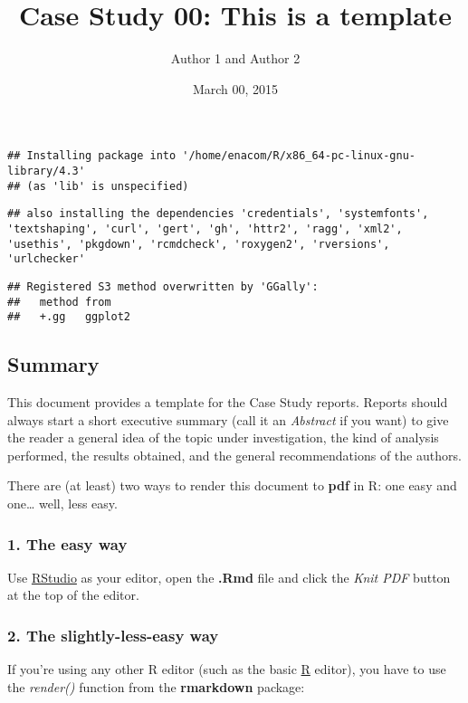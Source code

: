 \documentclass[
]{article}
\title{Case Study 00: This is a template}
\author{Author 1 and Author 2}
\date{March 00, 2015}
\begin{document}
\maketitle

\begin{verbatim}
## Installing package into '/home/enacom/R/x86_64-pc-linux-gnu-library/4.3'
## (as 'lib' is unspecified)
\end{verbatim}

\begin{verbatim}
## also installing the dependencies 'credentials', 'systemfonts', 'textshaping', 'curl', 'gert', 'gh', 'httr2', 'ragg', 'xml2', 'usethis', 'pkgdown', 'rcmdcheck', 'roxygen2', 'rversions', 'urlchecker'
\end{verbatim}

\begin{verbatim}
## Registered S3 method overwritten by 'GGally':
##   method from   
##   +.gg   ggplot2
\end{verbatim}

\subsection{Summary}\label{summary}

This document provides a template for the Case Study reports. Reports
should always start a short executive summary (call it an
\emph{Abstract} if you want) to give the reader a general idea of the
topic under investigation, the kind of analysis performed, the results
obtained, and the general recommendations of the authors.

There are (at least) two ways to render this document to \textbf{pdf} in
R: one easy and one\ldots{} well, less easy.

\subsubsection{1. The easy way}\label{the-easy-way}

Use \href{http://rstudio.com/}{RStudio} as your editor, open the
\textbf{.Rmd} file and click the \emph{Knit PDF} button at the top of
the editor.

\subsubsection{2. The slightly-less-easy
way}\label{the-slightly-less-easy-way}

If you're using any other R editor (such as the basic
\href{http://cran.r-project.org}{R} editor), you have to use the
\emph{render()} function from the \textbf{rmarkdown} package:
\end{document}

